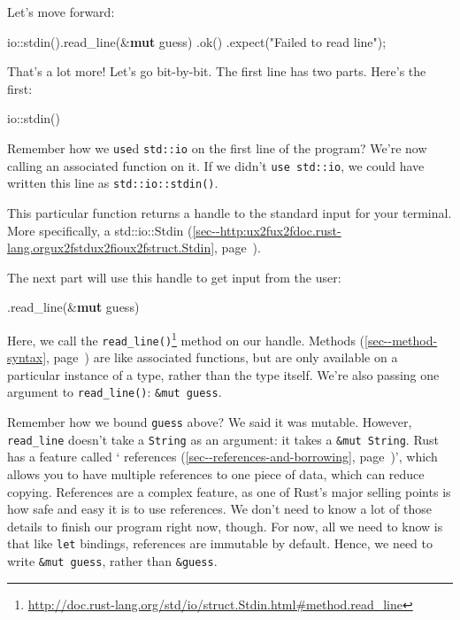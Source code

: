 \documentclass[a4paper,]{book}
\renewcommand*{\hyperref}[2][\ar]{%
  \def\ar{#2}%
  #2 (\autoref{#1}, page~\pageref{#1})}
\newenvironment{Shaded}{\begin{snugshade}}{\end{snugshade}}
\newcommand{\KeywordTok}[1]{\textcolor[rgb]{0.13,0.29,0.53}{\textbf{{#1}}}}
\newcommand{\StringTok}[1]{\textcolor[rgb]{0.31,0.60,0.02}{{#1}}}
\newcommand{\NormalTok}[1]{{#1}}
\renewcommand{\href}[2]{#2\footnote{\url{#1}}}
\begin{document}
Let's move forward:

\begin{Shaded}
\begin{Highlighting}[]
    \NormalTok{io::stdin().read_line(&}\KeywordTok{mut} \NormalTok{guess)}
        \NormalTok{.ok()}
        \NormalTok{.expect(}\StringTok{"Failed to read line"}\NormalTok{);}
\end{Highlighting}
\end{Shaded}

That's a lot more! Let's go bit-by-bit. The first line has two parts.
Here's the first:

\begin{Shaded}
\begin{Highlighting}[]
\NormalTok{io::stdin()}
\end{Highlighting}
\end{Shaded}

Remember how we \texttt{use}d \texttt{std::io} on the first line of the
program? We're now calling an associated function on it. If we didn't
\texttt{use\ std::io}, we could have written this line as
\texttt{std::io::stdin()}.

This particular function returns a handle to the standard input for your
terminal. More specifically, a
\hyperref[sec--http:ux2fux2fdoc.rust-lang.orgux2fstdux2fioux2fstruct.Stdin]{std::io::Stdin}.

The next part will use this handle to get input from the user:

\begin{Shaded}
\begin{Highlighting}[]
\NormalTok{.read_line(&}\KeywordTok{mut} \NormalTok{guess)}
\end{Highlighting}
\end{Shaded}

Here, we call the
\href{http://doc.rust-lang.org/std/io/struct.Stdin.html\#method.read_line}{\texttt{read\_line()}}
method on our handle. \hyperref[sec--method-syntax]{Methods} are like
associated functions, but are only available on a particular instance of
a type, rather than the type itself. We're also passing one argument to
\texttt{read\_line()}: \texttt{\&mut\ guess}.

Remember how we bound \texttt{guess} above? We said it was mutable.
However, \texttt{read\_line} doesn't take a \texttt{String} as an
argument: it takes a \texttt{\&mut\ String}. Rust has a feature called
`\hyperref[sec--references-and-borrowing]{references}', which allows you
to have multiple references to one piece of data, which can reduce
copying. References are a complex feature, as one of Rust's major
selling points is how safe and easy it is to use references. We don't
need to know a lot of those details to finish our program right now,
though. For now, all we need to know is that like \texttt{let} bindings,
references are immutable by default. Hence, we need to write
\texttt{\&mut\ guess}, rather than \texttt{\&guess}.
\end{document}
